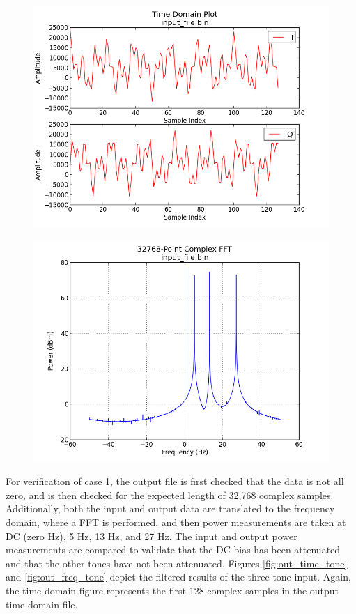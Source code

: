 \documentclass{article}
\begin{document}
	\begin{figure}[ht]
		\centering
		\begin{minipage}{.5\textwidth}
			\centering\includegraphics[width=1.0\linewidth]{input_time_tones}
			\label{fig:in_time_tone}
		\end{minipage}%
		\begin{minipage}{.5\textwidth}
			\centering\includegraphics[width=1.0\linewidth]{input_freq_tones}
			\label{fig:in_freq_tone}
		\end{minipage}
	\end{figure}
	\noindent For verification of case 1, the output file is first checked that the data is not all zero, and is then checked for the expected length of 32,768 complex samples. Additionally, both the input and output data are translated to the frequency domain, where a FFT is performed, and then power measurements are taken at DC (zero Hz), 5 Hz, 13 Hz, and 27 Hz. The input and output power measurements are compared to validate that the DC bias has been attenuated and that the other tones have not been attenuated. Figures \ref{fig:out_time_tone} and \ref{fig:out_freq_tone} depict the filtered results of the three tone input. Again, the time domain figure represents the first 128 complex samples in the output time domain file.
\end{document}
